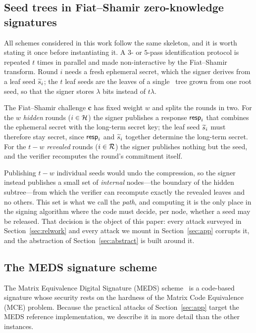 \subsection{Seed trees in Fiat--Shamir zero-knowledge signatures}
\label{sec:template}

All schemes considered in this work follow the same skeleton, and it is worth
stating it once before instantiating it. A $3$- or $5$-pass identification
protocol is repeated $t$ times in parallel and made non-interactive by the
Fiat--Shamir transform. Round $i$ needs a fresh ephemeral secret, which the
signer derives from a leaf seed $\widetilde{s}_i$; the $t$ leaf seeds are the leaves
of a single \GGM\ tree grown from one root seed, so that the signer stores
$\lambda$ bits instead of $t\lambda$.

The Fiat--Shamir challenge $\mathbf{c}$ has fixed weight $w$ and splits the
rounds in two. For the $w$ \emph{hidden} rounds ($i \in \mathcal{H}$) the signer
publishes a response $\mathsf{resp}_i$ that combines the ephemeral secret with the
long-term secret key; the leaf seed $\widetilde{s}_i$ must therefore stay secret,
since $\mathsf{resp}_i$ and $\widetilde{s}_i$ together determine the long-term secret. For
the $t-w$ \emph{revealed} rounds ($i \in \mathcal{R}$) the signer publishes nothing
but the seed, and the verifier recomputes the round's commitment itself.

Publishing $t-w$ individual seeds would undo the compression, so the signer
instead publishes a small set of \emph{internal} nodes---the boundary of the
hidden subtree---from which the verifier can recompute exactly the revealed
leaves and no others. This set is what we call the \emph{path}, and computing
it is the only place in the signing algorithm where the code must decide, per
node, whether a seed may be released. That decision is the object of this
paper: every attack surveyed in Section~\ref{sec:relwork} and every attack we
mount in Section~\ref{sec:app} corrupts it, and the abstraction of
Section~\ref{sec:abstract} is built around it.

\subsection{The MEDS signature scheme}
\label{sec:meds}

The Matrix Equivalence Digital Signature (MEDS) scheme~\cite{ChouNPRRST23} is
a code-based signature whose security rests on the hardness of the Matrix Code
Equivalence (MCE) problem. Because the practical attacks of
Section~\ref{sec:app} target the MEDS reference implementation, we describe it
in more detail than the other instances.

